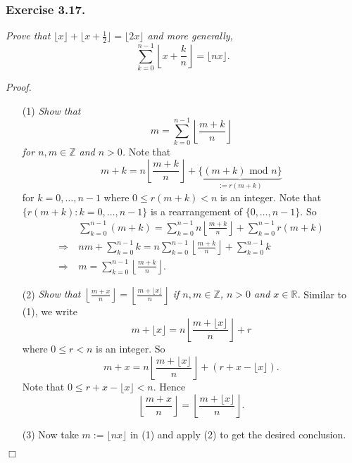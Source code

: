 \documentclass{article}
\begin{document}
\subsubsection*{Exercise 3.17.}
\emph{Prove that $\lfloor x \rfloor + \lfloor x+\frac{1}{2} \rfloor = \lfloor 2x \rfloor$
and more generally,}
\[
  \sum_{k=0}^{n-1} \left\lfloor x + \frac{k}{n} \right\rfloor
  = \lfloor nx \rfloor.
\]



\emph{Proof.}
\begin{enumerate}
\item[(1)]
  \emph{Show that
  \[
    m = \sum_{k=0}^{n-1} \left\lfloor \frac{m + k}{n} \right\rfloor
  \]
  for $n, m \in \mathbb{Z}$ and $n > 0$.}
  Note that
  \[
    m + k
    = n \left\lfloor \frac{m + k}{n} \right\rfloor
        + \underbrace{\{ (m + k) \text{ mod } n \}}_{:= r(m+k)}
  \]
  for $k = 0, \ldots, n-1$ where $0 \leq r(m+k) < n$ is an integer.
  Note that $\{ r(m+k) : k = 0, \ldots, n-1 \}$ is a rearrangement of $\{ 0, \ldots, n-1 \}$.
  So
  \begin{align*}
    &\: \sum_{k=0}^{n-1} (m+k)
    = \sum_{k=0}^{n-1} n \left\lfloor \frac{m + k}{n} \right\rfloor + \sum_{k=0}^{n-1} r(m+k) \\
    \Longrightarrow &\:
    nm + \sum_{k=0}^{n-1} k
    = n \sum_{k=0}^{n-1} \left\lfloor \frac{m + k}{n} \right\rfloor + \sum_{k=0}^{n-1} k \\
    \Longrightarrow &\:
    m = \sum_{k=0}^{n-1} \left\lfloor \frac{m + k}{n} \right\rfloor.
  \end{align*}

\item[(2)]
  \emph{Show that $\left\lfloor \frac{m + x}{n} \right\rfloor
  = \left\lfloor \frac{m + \lfloor x \rfloor}{n} \right\rfloor$
  if $n, m \in \mathbb{Z}$, $n > 0$ and $x \in \mathbb{R}$.}
  Similar to (1), we write
  \[
    m + \lfloor x \rfloor
    = n \left\lfloor \frac{m + \lfloor x \rfloor}{n} \right\rfloor + r
  \]
  where $0 \leq r < n$ is an integer.
  So
  \[
    m + x
    = n \left\lfloor \frac{m + \lfloor x \rfloor}{n} \right\rfloor
    + (r + x - \lfloor x \rfloor).
  \]
  Note that $0 \leq r + x - \lfloor x \rfloor < n$.
  Hence
  \[
    \left\lfloor \frac{m + x}{n} \right\rfloor
    = \left\lfloor \frac{m + \lfloor x \rfloor}{n} \right\rfloor.
  \]

\item[(3)]
  Now take $m := \lfloor nx \rfloor$ in (1) and apply (2) to get the desired conclusion.
\end{enumerate}
$\Box$ \\
\end{document}
